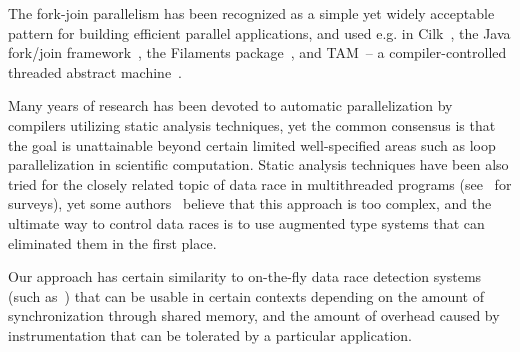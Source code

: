 \documentclass{acm_proc_article-sp}
\begin{document}
The fork-join parallelism has been recognized as a simple yet widely
acceptable pattern for building efficient parallel applications, and used e.g. in
Cilk~\cite{BJKLR96}, the Java fork/join framework~\cite{Lea00}, the
Filaments package~\cite{LF00}, and {TAM}~-- a compiler-controlled
threaded abstract machine~\cite{CGSE93,GSC95}. 

Many years of research has been devoted to automatic parallelization
by compilers utilizing static analysis techniques, yet the common
consensus is that the goal is unattainable beyond certain limited
well-specified areas such as loop parallelization in scientific
computation. Static analysis techniques have been also tried for the
closely related topic of data race in multithreaded programs
(see~\cite{Rinard01,NAW06} for surveys), yet some
authors~\cite{Rinard01} believe that this approach is too complex, and
the ultimate way to control data races is to use augmented type systems
that can eliminated them in the first place.

Our approach has certain similarity to on-the-fly data race detection
systems (such as~\cite{MellorCrummey91,SBNSA97,HRY02}) that can be
usable in certain contexts depending on the amount of synchronization
through shared memory, and the amount of overhead caused by instrumentation that
can be tolerated by a particular application.



\end{document}
